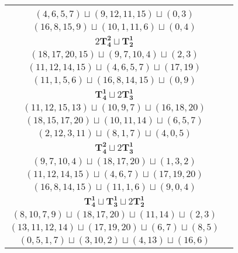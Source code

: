 \documentclass{article}
\begin{document}
\begin{longtable}{|c|c|}
\begin{tabular}{c}
        $(5,3,4,7)\sqcup(16,17,20,15)\sqcup(0,2)$ \\ 
        $(4,6,5,7)\sqcup(9,12,11,15)\sqcup(0,3)$ \\ 
        $(16,8,15,9)\sqcup(10,1,11,6)\sqcup(0,4)$
        \end{tabular} \\ 
        \hline
        $2\mathbf{T_{4}^{2}} \sqcup \mathbf{T_{2}^{1}}$ & \begin{tabular}{c}
        $(18,15,13,14)\sqcup(11,9,12,6)\sqcup(1,2)$ \\ 
        $(18,17,20,15)\sqcup(9,7,10,4)\sqcup(2,3)$ \\ 
        $(11,12,14,15)\sqcup(4,6,5,7)\sqcup(17,19)$ \\ 
        $(11,1,5,6)\sqcup(16,8,14,15)\sqcup(0,9)$
        \end{tabular} \\ 
        \hline
        $\mathbf{T_{4}^{1}} \sqcup 2\mathbf{T_{3}^{1}}$ & \begin{tabular}{c}
        $(16,15,14,13)\sqcup(0,3,5)\sqcup(12,9,6)$ \\ 
        $(11,12,15,13)\sqcup(10,9,7)\sqcup(16,18,20)$ \\ 
        $(18,15,17,20)\sqcup(10,11,14)\sqcup(6,5,7)$ \\ 
        $(2,12,3,11)\sqcup(8,1,7)\sqcup(4,0,5)$
        \end{tabular} \\ 
        \hline
        $\mathbf{T_{4}^{2}} \sqcup 2\mathbf{T_{3}^{1}}$ & \begin{tabular}{c}
        $(11,9,12,6)\sqcup(18,15,13)\sqcup(0,1,2)$ \\ 
        $(9,7,10,4)\sqcup(18,17,20)\sqcup(1,3,2)$ \\ 
        $(11,12,14,15)\sqcup(4,6,7)\sqcup(17,19,20)$ \\ 
        $(16,8,14,15)\sqcup(11,1,6)\sqcup(9,0,4)$
        \end{tabular} \\ 
        \hline
        $\mathbf{T_{4}^{1}} \sqcup \mathbf{T_{3}^{1}} \sqcup 2\mathbf{T_{2}^{1}}$ & \begin{tabular}{c}
        $(8,6,9,11)\sqcup(0,1,2)\sqcup(16,19)\sqcup(18,15)$ \\ 
        $(8,10,7,9)\sqcup(18,17,20)\sqcup(11,14)\sqcup(2,3)$ \\ 
        $(13,11,12,14)\sqcup(17,19,20)\sqcup(6,7)\sqcup(8,5)$ \\ 
        $(0,5,1,7)\sqcup(3,10,2)\sqcup(4,13)\sqcup(16,6)$
        \end{tabular} \\ 

\end{longtable}
\end{document}

